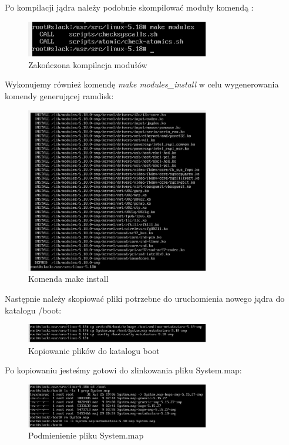 \documentclass[12pt]{article}
\begin{document}
Po kompilacji jądra należy podobnie skompilować moduły komendą :

\begin{figure}[H]
\centering
\includegraphics[width=8cm]{kompilacja-modulow.jpg}
\caption{Zakończona kompilacja modułów}
\end{figure}

Wykonujemy również komendę \textit{make modules_install} w celu wygenerowania komendy generującej ramdisk:

\begin{figure}[H]
\centering
\includegraphics[width=8cm]{make install.jpg}
\caption{Komenda make install}
\end{figure}

Następnie należy skopiować pliki potrzebne do uruchomienia nowego jądra do katalogu /boot:

\begin{figure}[H]
\centering
\includegraphics[width=8cm]{kopiowanieplikow.jpg}
\caption{Kopiowanie plików do katalogu boot}
\end{figure}

Po kopiowaniu jesteśmy gotowi do zlinkowania pliku System.map:

\begin{figure}[H]
\centering
\includegraphics[width=8cm]{linksystemmap.jpg}
\caption{Podmienienie pliku System.map}
\end{figure}
\end{document}
